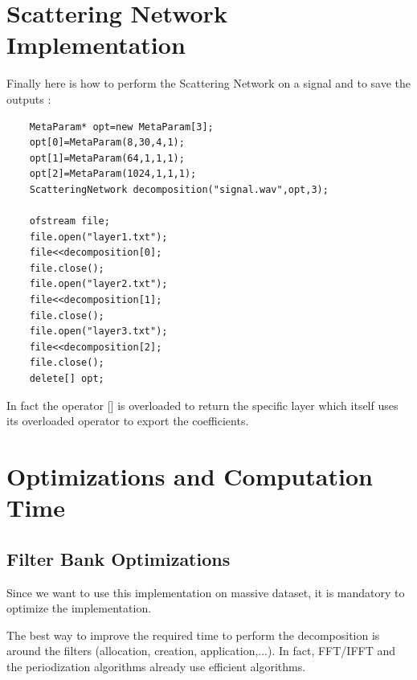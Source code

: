 \documentclass[a4paper]{report}
\begin{document}
\section{Scattering Network Implementation}
Finally here is how to perform the Scattering Network on a signal and to save the outputs :
\begin{lstlisting}
    MetaParam* opt=new MetaParam[3];
    opt[0]=MetaParam(8,30,4,1);
    opt[1]=MetaParam(64,1,1,1);
    opt[2]=MetaParam(1024,1,1,1);
    ScatteringNetwork decomposition("signal.wav",opt,3);

    ofstream file;
    file.open("layer1.txt");
    file<<decomposition[0];
    file.close();
    file.open("layer2.txt");
    file<<decomposition[1];
    file.close();
    file.open("layer3.txt");
    file<<decomposition[2];
    file.close();
    delete[] opt;
\end{lstlisting}
In fact the operator [] is overloaded to return the specific layer which itself uses its overloaded operator to export the coefficients.

\section{Optimizations and Computation Time}
\subsection{Filter Bank Optimizations}
Since we want to use this implementation on massive dataset, it is mandatory to optimize the implementation.

The best way to improve the required time to perform the decomposition is around the filters (allocation, creation, application,...). In fact, FFT/IFFT and the periodization algorithms already use efficient algorithms. 
\end{document}
